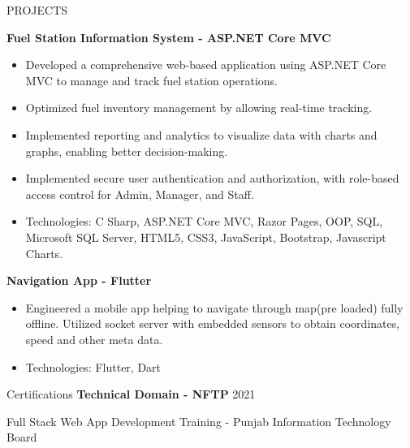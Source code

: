 \documentclass{resume} %
\begin{document}
\begin{rSection}{PROJECTS}
 \item \textbf{Fuel Station Information System - ASP.NET Core MVC}
 
  \begin{itemize}
 	\item Developed a comprehensive web-based application using ASP.NET Core MVC to manage and track fuel station operations.
 	\item Optimized fuel inventory management by allowing real-time tracking.
 	\item Implemented reporting and analytics to visualize data with charts and graphs, enabling better decision-making.
 
 	\item Implemented secure user authentication and authorization, with role-based access control for Admin, Manager, and Staff.
 	\item Technologies: C Sharp, ASP.NET Core MVC, Razor Pages, OOP, SQL, Microsoft SQL Server, HTML5, CSS3, JavaScript, Bootstrap, Javascript Charts.
 \end{itemize}
 
\item \textbf{Navigation App - Flutter} 
 \begin{itemize}
\item {Engineered a mobile app helping to navigate through map(pre loaded) fully offline. Utilized socket server with embedded sensors to obtain coordinates, speed and other meta data.}
\item {Technologies: Flutter, Dart}
 \end{itemize}

\end{rSection} 

\begin{rSection}{Certifications} 
	\textbf{Technical Domain - NFTP} \hfill 2021 
    \item {Full Stack Web App Development Training - Punjab Information Technology
    Board}



\end{rSection}

\end{document}
